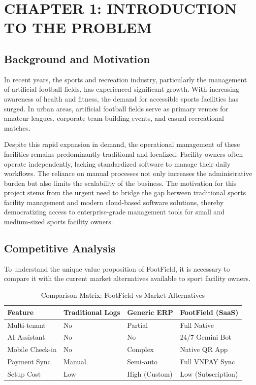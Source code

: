\section*{CHAPTER 1: INTRODUCTION TO THE PROBLEM}
\setcounter{section}{1}
\setcounter{subsection}{0}
\setcounter{figure}{0}
\setcounter{table}{0}

\subsection{Background and Motivation}
In recent years, the sports and recreation industry, particularly the management of artificial football fields, has experienced significant growth. With increasing awareness of health and fitness, the demand for accessible sports facilities has surged. In urban areas, artificial football fields serve as primary venues for amateur leagues, corporate team-building events, and casual recreational matches. 

Despite this rapid expansion in demand, the operational management of these facilities remains predominantly traditional and localized. Facility owners often operate independently, lacking standardized software to manage their daily workflows. The reliance on manual processes not only increases the administrative burden but also limits the scalability of the business. The motivation for this project stems from the urgent need to bridge the gap between traditional sports facility management and modern cloud-based software solutions, thereby democratizing access to enterprise-grade management tools for small and medium-sized sports facility owners.

\subsection{Competitive Analysis}
To understand the unique value proposition of FootField, it is necessary to compare it with the current market alternatives available to sport facility owners.

\begin{table}[htbp]
\centering
\begin{tabularx}{\textwidth}{|l|X|X|X|}
\hline
\rowcolor{LightCyan}
\textbf{Feature} & \textbf{Traditional Logs} & \textbf{Generic ERP} & \textbf{FootField (SaaS)} \\ \hline
Multi-tenant & No & Partial & Full Native \\ \hline
AI Assistant & No & No & 24/7 Gemini Bot \\ \hline
Mobile Check-in & No & Complex & Native QR App \\ \hline
Payment Sync & Manual & Semi-auto & Full VNPAY Sync \\ \hline
Setup Cost & Low & High (Custom) & Low (Subscription) \\ \hline
\end{tabularx}
\caption{Comparison Matrix: FootField vs Market Alternatives}
\end{table}

